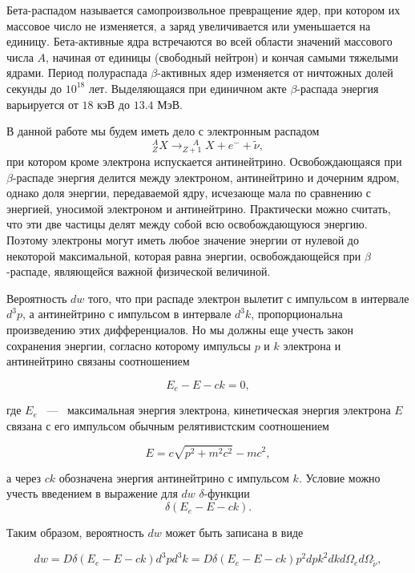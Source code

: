 Бета-распадом называется самопроизвольное превращение ядер, при котором их
массовое число не изменяется, а заряд увеличивается или уменьшается на единицу.
Бета-активные ядра встречаются во всей области значений массового числа $A$,
начиная от единицы (свободный нейтрон) и кончая самыми тяжелыми ядрами. Период
полураспада $\beta$-активных ядер изменяется от ничтожных долей секунды до
$10^{18}$ лет. Выделяющаяся при единичном акте $\beta$-распада энергия
варьируется от $18$ кэВ до $13.4$ МэВ.

В данной работе мы будем иметь дело с электронным распадом
\[
  ^A_ZX \rightarrow ^{\; \; \; \; \:A}_{Z + 1}X + e^{ -} + \widetilde{\nu},
\]
при котором кроме электрона испускается антинейтрино. Освобождающаяся при
$\beta$-распаде энергия делится между электроном, антинейтрино и дочерним ядром,
однако доля энергии, передаваемой ядру, исчезающе мала по сравнению с энергией,
уносимой электроном и антинейтрино. Практически можно считать, что эти две
частицы делят между собой всю освобождающуюся энергию. Поэтому электроны могут
иметь любое значение энергии  от нулевой до некоторой максимальной, которая
равна энергии, освобождающейся при $\beta$-распаде, являющейся важной физической
величиной.

Вероятность $dw$ того, что при распаде электрон вылетит с импульсом в
интервале $d^3p$, а антинейтрино с импульсом в интервале $d^3k$, пропорциональна
произведению этих дифференциалов. Но мы должны еще учесть закон сохранения
энергии, согласно которому импульсы $p$ и $k$ электрона и антинейтрино
связаны соотношением

\begin{equation}
E_e - E - ck = 0,
\end{equation}

где $E_e$ ~---~ максимальная энергия электрона, кинетическая энергия электрона
$E$ связана с его импульсом обычным релятивистским соотношением

\begin{equation}
E = c\sqrt{p^2 + m^2c^2} - mc^2,
\end{equation}

а через $ck$ обозначена энергия антинейтрино с импульсом $k$. Условие можно
учесть введением в выражение для $dw$ $\delta$-функции
\begin{equation}
\delta (E_e - E - ck).
\end{equation}

Таким образом, вероятность $dw$ может быть записана в виде

\begin{equation}\label{eq::dw}
dw = D \delta (E_e - E - ck)d^3 p d^3 k = D \delta (E_e - E - ck)p^2dpk^2dkd{\Omega}_ed{\Omega}_{\widetilde{\nu}},
\end{equation}

